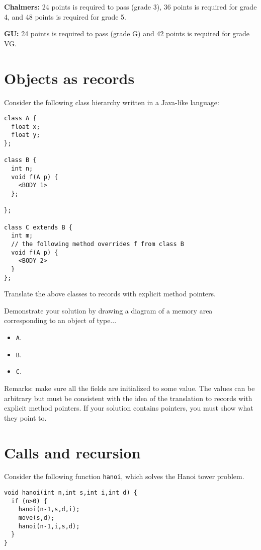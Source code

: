 \documentclass{article}
\begin{document}
\textbf{Chalmers:}
24 points is required to pass (grade 3), 36 points is required for
grade 4, and 48 points is required for grade 5.

\textbf{GU:}
24 points is required to pass (grade G) and 42 points is
required for grade VG.

\section{Objects as records}

Consider the following class hierarchy written in a Java-like
language:
\begin{verbatim}
class A {
  float x;
  float y;
};

class B {
  int n;
  void f(A p) {
    <BODY 1>
  };

};

class C extends B {
  int m;
  // the following method overrides f from class B
  void f(A p) { 
    <BODY 2>
  }
};
\end{verbatim}

Translate the above classes to records with explicit method pointers.

Demonstrate your solution by drawing a diagram of a memory area
corresponding to an object of type...
\begin{itemize}
\item \texttt A. 
\item \texttt B. 
\item \texttt C. 
\end{itemize}
Remarks: make sure all the fields are initialized to some value. The
values can be arbitrary but must be consistent with the idea of the
translation to records with explicit method pointers. If your solution
contains pointers, you must show what they point to.
\newpage
\section{Calls and recursion}

Consider the following function \texttt{hanoi},
which solves the Hanoi tower problem.

\begin{verbatim}
void hanoi(int n,int s,int i,int d) {
  if (n>0) {
    hanoi(n-1,s,d,i);
    move(s,d);
    hanoi(n-1,i,s,d);
  }
}
\end{verbatim}
\end{document}
